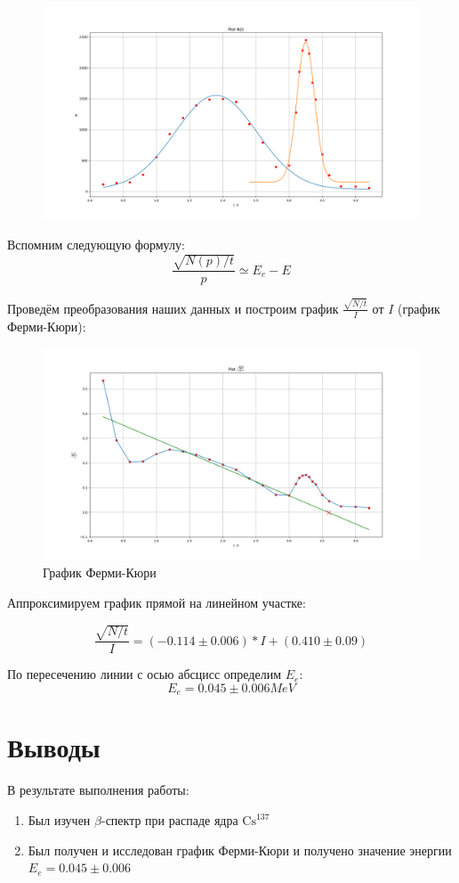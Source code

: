 \documentclass{article}
\begin{document}
\begin{figure}[H]
	\includegraphics[width=\textwidth]{I-N.png}
\end{figure}

Вспомним следующую формулу:
\[ \frac{\sqrt{N(p)/t}}{p} \simeq E_e - E \]

Проведём преобразования наших данных и построим график \(\frac{\sqrt{N/t}}{I}\) от \(I\)
(график Ферми-Кюри):

\begin{figure}[H]
	\includegraphics[width=\textwidth]{I-Nr.png}
	\caption{График Ферми-Кюри}
\end{figure}

Аппроксимируем график прямой на линейном участке:

\[ \frac{\sqrt{N/t}}{I} = (-0.114 \pm 0.006) * I + (0.410 \pm 0.09)\]

По пересечению линии с осью абсцисс определим \(E_e\):
\[ E_e = 0.045 \pm 0.006 MeV\]

\section{Выводы}
В результате выполнения работы:
\begin{enumerate}
	\item Был изучен \(\beta\)-спектр при распаде ядра \(\text{Cs}^{137}\)
	\item Был получен и исследован график Ферми-Кюри и получено значение энергии \(E_e = 0.045 \pm 0.006\)
\end{enumerate}
\end{document}
